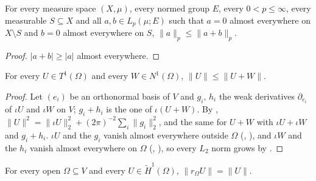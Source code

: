 \begin{lemma}
\label{lem:norm-disjoint-supports}
\leanok
For every measure space $(X, \mu)$, every normed group $E$, every $0 < p \leq \infty$, every
measurable $S \subseteq X$ and all $a, b \in L_p(\mu; E)$ such that $a = 0$ almost everywhere on
$X \setminus S$ and $b = 0$ almost everywhere on $S$, $\|a\|_p \leq \|a + b\|_p$.
\end{lemma}

\begin{proof}
\leanok
$|a + b| \geq |a|$ almost everywhere.
\end{proof}

\begin{proposition}
\label{prop:sobolev-test-norm-minimal}
\leanok
{}
For every $U \in T^1(\Omega)$ and every $W \in N^1(\Omega)$, $\|U\| \leq \|U + W\|$.
\end{proposition}

\begin{proof}
\leanok
Let $(e_i)$ be an orthonormal basis of $V$ and $g_i$, $h_i$ the weak derivatives
$\partial_{e_i}$ of $\iota U$ and $\iota W$ on $V$; $g_i + h_i$ is the one of $\iota(U + W)$.
By ,
$\|U\|^2 = \|\iota U\|_2^2 + (2\pi)^{-2} \sum_i \|g_i\|_2^2$, and the same for $U + W$ with
$\iota U + \iota W$ and $g_i + h_i$. $\iota U$ and the $g_i$ vanish almost everywhere outside
$\Omega$ (, ), and
$\iota W$ and the $h_i$ vanish almost everywhere on $\Omega$
(, ), so every $L_2$ norm
grows by .
\end{proof}

\begin{theorem}
\label{thm:sobolev-tilde-restriction-isometry}
\leanok
{}
For every open $\Omega \subseteq V$ and every $U \in \tilde H^1(\Omega)$,
$\|r_\Omega U\| = \|U\|$.
\end{theorem}

